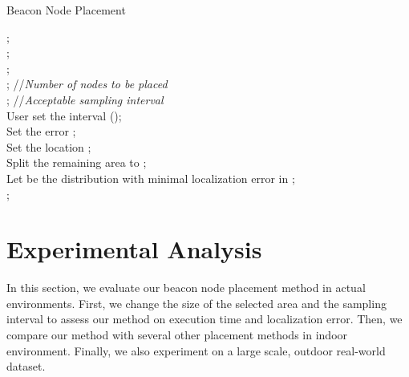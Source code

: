 \documentclass[10pt, conference, letterpaper]{IEEEtran}
\begin{document}
\begin{algorithm} \label{Synthesize}
\caption{Beacon Node Placement}
;\\
;\\
;\\
; //\emph{Number of nodes to be placed}\\
; //\emph{Acceptable sampling interval}\\
User set the interval  ();\\
Set the error ;\\
Set the location ;\\
Split the remaining area  to ;\\
Let  be the distribution with minimal localization error in ;\\
\Return ;
\end{algorithm}

\section{Experimental Analysis} \label{Evaluation}
In this section, we evaluate our beacon node placement method in actual environments. First, we change the size of the selected area and the sampling interval to assess our method on execution time and localization error. Then, we compare our method with several other placement methods in indoor environment. Finally, we also experiment on a large scale, outdoor real-world dataset.
\end{document}
